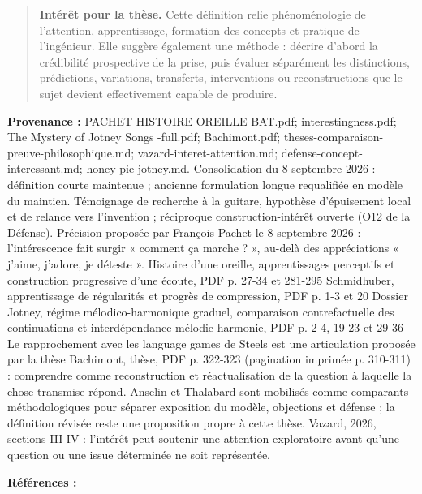\documentclass[10pt,a4paper]{article}
\begin{document}
\begin{quote}
\textbf{Intérêt pour la thèse.} Cette définition relie phénoménologie de l'attention, apprentissage, formation des concepts et pratique de l'ingénieur. Elle suggère également une méthode : décrire d'abord la crédibilité prospective de la prise, puis évaluer séparément les distinctions, prédictions, variations, transferts, interventions ou reconstructions que le sujet devient effectivement capable de produire.
\end{quote}
{\footnotesize\color{metadata}\textbf{Provenance :} PACHET HISTOIRE OREILLE BAT.pdf; interestingness.pdf; The Mystery of Jotney Songs -full.pdf; Bachimont.pdf; theses-comparaison-preuve-philosophique.md; vazard-interet-attention.md; defense-concept-interessant.md; honey-pie-jotney.md. Consolidation du 8 septembre 2026 : définition courte maintenue ; ancienne formulation longue requalifiée en modèle du maintien. Témoignage de recherche à la guitare, hypothèse d'épuisement local et de relance vers l'invention ; réciproque construction-intérêt ouverte (O12 de la Défense). Précision proposée par François Pachet le 8 septembre 2026 : l'intérescence fait surgir « comment ça marche ? », au-delà des appréciations « j'aime, j'adore, je déteste ». Histoire d'une oreille, apprentissages perceptifs et construction progressive d'une écoute, PDF p. 27-34 et 281-295 Schmidhuber, apprentissage de régularités et progrès de compression, PDF p. 1-3 et 20 Dossier Jotney, régime mélodico-harmonique graduel, comparaison contrefactuelle des continuations et interdépendance mélodie-harmonie, PDF p. 2-4, 19-23 et 29-36 Le rapprochement avec les language games de Steels est une articulation proposée par la thèse Bachimont, thèse, PDF p. 322-323 (pagination imprimée p. 310-311) : comprendre comme reconstruction et réactualisation de la question à laquelle la chose transmise répond. Anselin et Thalabard sont mobilisés comme comparants méthodologiques pour séparer exposition du modèle, objections et défense ; la définition révisée reste une proposition propre à cette thèse. Vazard, 2026, sections III-IV : l'intérêt peut soutenir une attention exploratoire avant qu'une question ou une issue déterminée ne soit représentée.\par}
{\footnotesize\color{metadata}\textbf{Références :} \parencite{pachet2018oreille,schmidhuber1997interesting,steels2005coordinating,steels2015talkingheads,bachimont1996hermeneutique,anselin2021attention,thalabard2012attention,vazard2026inquiry}\par}
\end{document}
